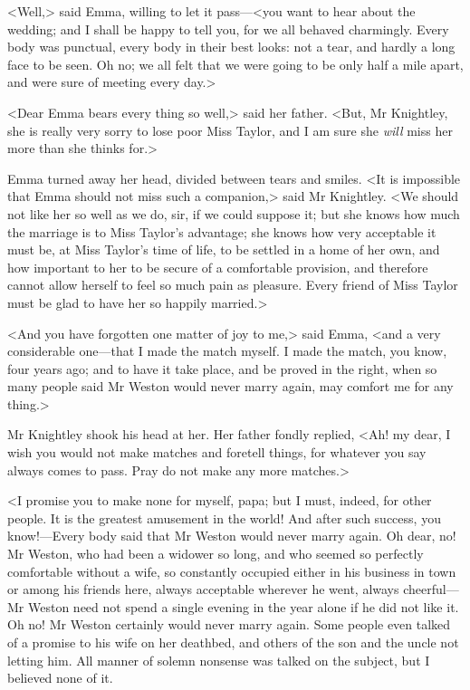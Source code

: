 <Well,> said Emma, willing to let it pass—<you want to hear about the wedding; and I shall be happy to tell you, for we all behaved charmingly. Every body was punctual, every body in their best looks: not a tear, and hardly a long face to be seen. Oh no; we all felt that we were going to be only half a mile apart, and were sure of meeting every day.>

<Dear Emma bears every thing so well,> said her father. <But, Mr Knightley, she is really very sorry to lose poor Miss Taylor, and I am sure she \textit{will} miss her more than she thinks for.>

Emma turned away her head, divided between tears and smiles. <It is impossible that Emma should not miss such a companion,> said Mr Knightley. <We should not like her so well as we do, sir, if we could suppose it; but she knows how much the marriage is to Miss Taylor's advantage; she knows how very acceptable it must be, at Miss Taylor's time of life, to be settled in a home of her own, and how important to her to be secure of a comfortable provision, and therefore cannot allow herself to feel so much pain as pleasure. Every friend of Miss Taylor must be glad to have her so happily married.>

<And you have forgotten one matter of joy to me,> said Emma, <and a very considerable one—that I made the match myself. I made the match, you know, four years ago; and to have it take place, and be proved in the right, when so many people said Mr Weston would never marry again, may comfort me for any thing.>

Mr Knightley shook his head at her. Her father fondly replied, <Ah! my dear, I wish you would not make matches and foretell things, for whatever you say always comes to pass. Pray do not make any more matches.>

<I promise you to make none for myself, papa; but I must, indeed, for other people. It is the greatest amusement in the world! And after such success, you know!—Every body said that Mr Weston would never marry again. Oh dear, no! Mr Weston, who had been a widower so long, and who seemed so perfectly comfortable without a wife, so constantly occupied either in his business in town or among his friends here, always acceptable wherever he went, always cheerful—Mr Weston need not spend a single evening in the year alone if he did not like it. Oh no! Mr Weston certainly would never marry again. Some people even talked of a promise to his wife on her deathbed, and others of the son and the uncle not letting him. All manner of solemn nonsense was talked on the subject, but I believed none of it.

